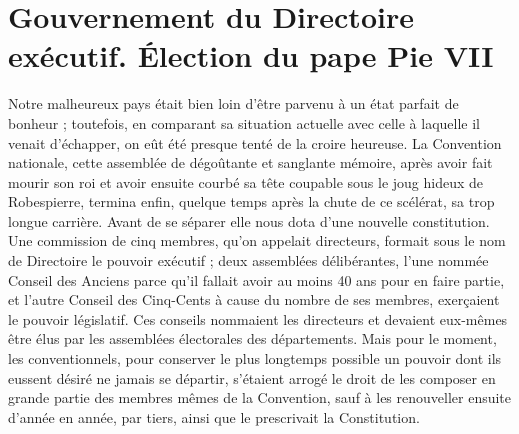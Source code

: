 \chapter{Gouvernement du Directoire exécutif. Élection du pape Pie VII}

Notre malheureux pays était bien loin d'être parvenu à un état parfait de bonheur ; toutefois, en comparant sa situation actuelle avec celle à laquelle il venait d'échapper, on eût été presque tenté de la croire heureuse. La Convention nationale, cette assemblée de dégoûtante et sanglante mémoire, après avoir fait mourir son roi et avoir ensuite courbé sa tête coupable sous le joug hideux de Robespierre, termina enfin, quelque
temps après la chute de ce scélérat, sa trop longue carrière. Avant de se séparer elle nous dota d'une nouvelle constitution. Une commission de cinq membres, qu'on appelait directeurs, formait sous le nom de Directoire le pouvoir exécutif ; deux assemblées délibérantes, l'une nommée Conseil des Anciens parce qu'il fallait avoir au moins 40 ans pour en faire partie, et l'autre Conseil des Cinq-Cents à cause du nombre de ses membres, exerçaient le pouvoir législatif. Ces conseils nommaient les directeurs et devaient eux-mêmes être élus par les assemblées électorales des départements. Mais pour le moment, les conventionnels, pour conserver le plus longtemps possible un pouvoir dont ils eussent désiré ne jamais se départir, s'étaient arrogé le droit de les composer en grande partie des membres mêmes de la Convention, sauf à les renouveller ensuite d'année en année, par tiers, ainsi que le prescrivait la Constitution.

